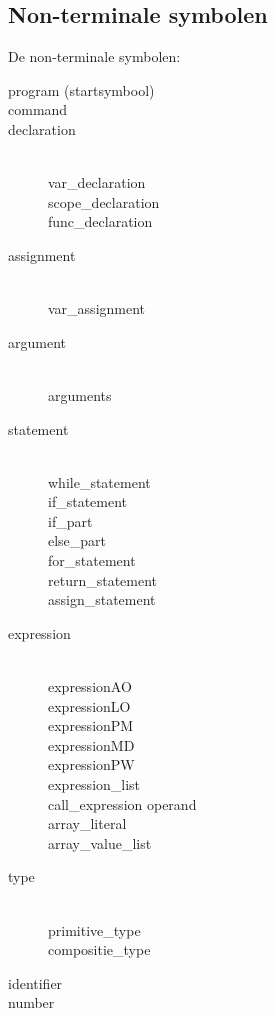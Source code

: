 \subsection{Non-terminale symbolen} %
\label{sub:non_terminale_symbolen}
De non-terminale symbolen:
\begin{description}
    \item[program (startsymbool)] 
    \item[command]
    \item[declaration] \hfill \\
        var\_declaration \\
        scope\_declaration \\
        func\_declaration
    \item[assignment] \hfill \\
        var\_assignment
    \item[argument] \hfill \\
        arguments
    \item[statement] \hfill \\
        while\_statement \\
        if\_statement \\ 
        if\_part \\
        else\_part \\
        for\_statement \\
        return\_statement \\
        assign\_statement
    \item[expression] \hfill \\
        expressionAO \\
        expressionLO \\
        expressionPM \\
        expressionMD \\
        expressionPW \\
        expression\_list \\
        call\_expression
        operand \\
        array\_literal \\
        array\_value\_list
    \item[type] \hfill \\
        primitive\_type \\
        compositie\_type
    \item[identifier]
    \item[number]
\end{description}

